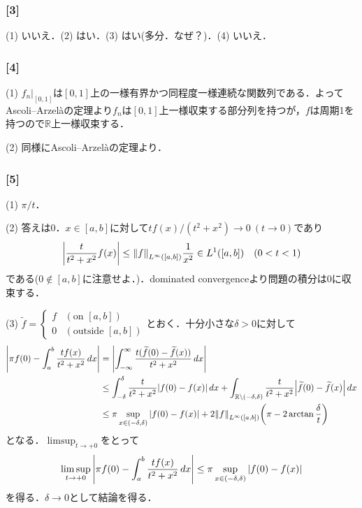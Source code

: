 \documentclass[a4j]{ltjsarticle}
\newcommand{\Rset}{\mathbb{R}}
\newcommand{\1}{\mathbbm{1}}
\numberwithin{equation}{section}
\theoremstyle{definition}
\begin{document}
\subsubsection*{[3]}\label{am_2022_3}
(1) いいえ．(2) はい．(3) はい(多分．なぜ？)．(4) いいえ．

\subsubsection*{[4]}
(1) $f_{n}|_{[0,1]}$は$[0,1]$上の一様有界かつ同程度一様連続な関数列である．よってAscoli--Arzelàの定理より$f_n$は$[0,1]$上一様収束する部分列を持つが，$f$は周期1を持つので$\Rset$上一様収束する．

(2) 同様にAscoli--Arzelàの定理より．

\subsubsection*{[5]}
(1) $\pi/t$．

(2) 答えは0．$x\in[a,b]$に対して$tf(x)/(t^2+x^2)\to0\ (t\to0)$であり
\begin{equation}
    \abs{\frac{t}{t^2+x^2}f(x)}\leq \norm{f}_{L^\infty([a,b])}\frac{1}{x^2} \in L^1([a,b])\quad (0<t<1) 
\end{equation}
である($0\notin [a,b]$に注意せよ．)．dominated convergenceより問題の積分は0に収束する．

(3) $\widetilde{f}=\begin{cases}
    f & (\text{on $[a,b]$})\\
    0 & (\text{outside $[a,b]$})
\end{cases}$とおく．十分小さな$\delta>0$に対して
\begin{align}
    \abs{\pi f(0)-\int_{a}^b \frac{tf(x)}{t^2+x^2}\,dx}
    &=\abs{\int_{-\infty}^{\infty}\frac{t(\widetilde{f}(0)-\widetilde{f}(x))}{t^2+x^2}\,dx}\\
    &\leq \int_{-\delta}^{\delta}\frac{t}{t^2+x^2}\abs{f(0)-f(x)}\,dx + \int_{\Rset\setminus(-\delta,\delta)}\frac{t}{t^2+x^2}\abs{\widetilde{f}(0)-\widetilde{f}(x)}\,dx\\
    &\leq \pi\sup_{x\in (-\delta,\delta)}\abs{f(0)-f(x)}+2\norm{f}_{L^\infty([a,b])}\qty(\pi-2\arctan\frac{\delta}{t})
\end{align}
となる．$\limsup_{t\to+0}$をとって
\begin{equation}
    \limsup_{t\to +0}\abs{\pi f(0)-\int_{a}^b \frac{tf(x)}{t^2+x^2}\,dx}\leq \pi\sup_{x\in(-\delta,\delta)}\abs{f(0)-f(x)}
\end{equation}
を得る．$\delta\to0$として結論を得る．
\end{document}
